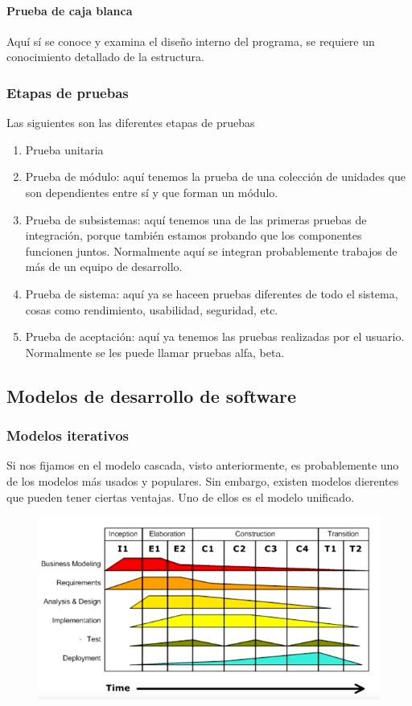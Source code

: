\paragraph{Prueba de caja blanca} Aquí sí se conoce y examina el diseño interno del programa, se requiere un conocimiento detallado de la estructura. 

\subsubsection{Etapas de pruebas}

Las siguientes son las diferentes etapas de pruebas

\begin{enumerate}
    \item Prueba unitaria
    \item Prueba de módulo: aquí tenemos la prueba de una colección de unidades que son dependientes entre sí y que forman un módulo.
    \item Prueba de subsistemas: aquí tenemos una de las primeras pruebas de integración, porque también estamos probando que los componentes funcionen juntos. Normalmente aquí se integran probablemente trabajos de más de un equipo de desarrollo. 
    \item Prueba de sistema: aquí ya se haceen pruebas diferentes de todo el sistema, cosas como rendimiento, usabilidad, seguridad, etc. 
    \item Prueba de aceptación: aquí ya tenemos las pruebas realizadas por el usuario. Normalmente se les puede llamar pruebas alfa, beta.
\end{enumerate}

\subsection{Modelos de desarrollo de software}

\subsubsection{Modelos iterativos}

Si nos fijamos en el modelo cascada, visto anteriormente, es probablemente uno de los modelos más usados y populares. Sin embargo, existen modelos dierentes que pueden tener ciertas ventajas. Uno de ellos es el modelo unificado. 

\begin{figure}[H]
    \centering
    \includegraphics[width=\columnwidth]{imgs/unifiedModel.png}
\end{figure}

